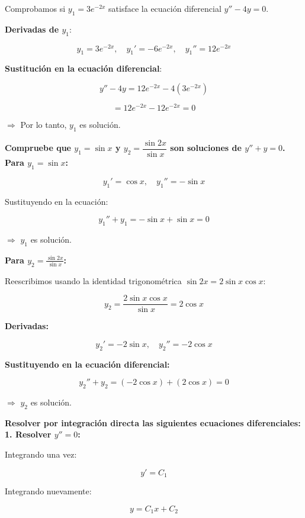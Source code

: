 \documentclass[answers]{exam}
\begin{document}
\begin{questions}
	Comprobamos si \( y_1 = 3e^{-2x} \) satisface la ecuación diferencial \( y'' - 4y = 0 \).

	\textbf{Derivadas de \( y_1 \)}:

	\[
		y_1 = 3e^{-2x}, \quad y_1' = -6e^{-2x}, \quad y_1'' = 12e^{-2x}
	\]

	\textbf{Sustitución en la ecuación diferencial}:

	\[
		y'' - 4y = 12e^{-2x} - 4(3e^{-2x})
	\]

	\[
		= 12e^{-2x} - 12e^{-2x} = 0
	\]

	\(\Rightarrow\) Por lo tanto, \( y_1 \) es solución.

	\newpage


	\question \textbf{Compruebe que \( y_1 = \sin x \) y $y_2 = \dfrac{\sin 2x}{\sin x}$ son soluciones de \( y'' + y = 0 \).}\\

	\textbf{Para \( y_1 = \sin x \):}

	\[
		y_1' = \cos x, \quad y_1'' = -\sin x
	\]

	Sustituyendo en la ecuación:

	\[
		y_1'' + y_1 = -\sin x + \sin x = 0
	\]

	\(\Rightarrow\) \( y_1 \) es solución.


	\textbf{Para \( y_2 = \frac{\sin 2x}{\sin x} \):}

	Reescribimos usando la identidad trigonométrica \( \sin 2x = 2\sin x \cos x \):

	\[
		y_2 = \frac{2\sin x \cos x}{\sin x} = 2\cos x
	\]

	\textbf{Derivadas:}

	\[
		y_2' = -2\sin x, \quad y_2'' = -2\cos x
	\]

	\textbf{Sustituyendo en la ecuación diferencial:}

	\[
		y_2'' + y_2 = (-2\cos x) + (2\cos x) = 0
	\]

	\(\Rightarrow\) \( y_2 \) es solución.

	\vspace{2em}
	\question \textbf{Resolver por integración directa las siguientes ecuaciones diferenciales:}\\
    
		\textbf{1. Resolver \( y'' = 0 \):}

		Integrando una vez:

		\[
			y' = C_1
		\]

		Integrando nuevamente:

		\[
			y = C_1 x + C_2
		\]


\end{questions}
\end{document}
